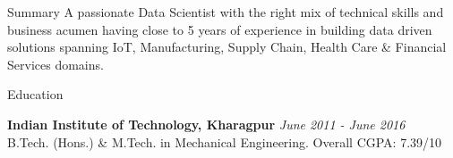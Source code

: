 \documentclass{resume}
\begin{document}
\begin{rSection}{Summary}
A passionate Data Scientist with the right mix of technical skills and business acumen having close to 5 years of experience in building data driven solutions spanning IoT, Manufacturing, Supply Chain, Health Care \& Financial Services domains.
\end{rSection}

\begin{rSection}{Education}

{\bf Indian Institute of Technology, Kharagpur} \hfill {\em June 2011 - June 2016} 
\\ B.Tech. (Hons.) \& M.Tech. in Mechanical Engineering.\hfill { Overall CGPA: 7.39/10}

\end{rSection}
\end{document}
